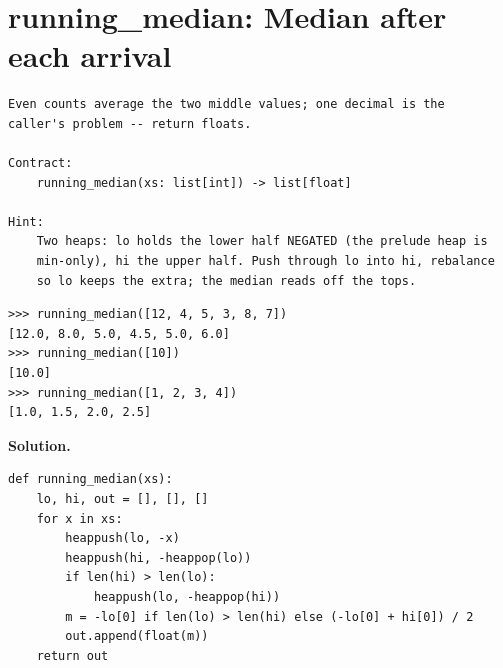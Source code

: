 \documentclass[10pt,letterpaper]{book}
\begin{document}
\section{running\_median: Median after each arrival}
\begin{lstlisting}[style=ex]
Even counts average the two middle values; one decimal is the
caller's problem -- return floats.

Contract:
    running_median(xs: list[int]) -> list[float]

Hint:
    Two heaps: lo holds the lower half NEGATED (the prelude heap is
    min-only), hi the upper half. Push through lo into hi, rebalance
    so lo keeps the extra; the median reads off the tops.
\end{lstlisting}
\begin{lstlisting}[style=ex]
>>> running_median([12, 4, 5, 3, 8, 7])
[12.0, 8.0, 5.0, 4.5, 5.0, 6.0]
>>> running_median([10])
[10.0]
>>> running_median([1, 2, 3, 4])
[1.0, 1.5, 2.0, 2.5]
\end{lstlisting}
\noindent\textbf{Solution.}
\begin{lstlisting}[style=code]
def running_median(xs):
    lo, hi, out = [], [], []
    for x in xs:
        heappush(lo, -x)
        heappush(hi, -heappop(lo))
        if len(hi) > len(lo):
            heappush(lo, -heappop(hi))
        m = -lo[0] if len(lo) > len(hi) else (-lo[0] + hi[0]) / 2
        out.append(float(m))
    return out
\end{lstlisting}
\end{document}
